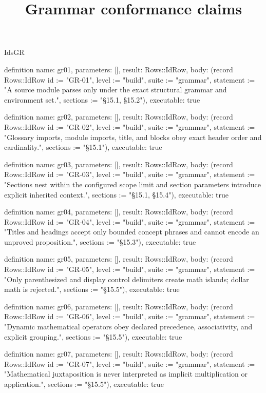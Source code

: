 \begin{lexlean}{IdsGR}
\title{Grammar conformance claims}
\begin{semanticmodule}
definition{
  name: gr01,
  parameters: [],
  result: Rows::IdRow,
  body: (record Rows::IdRow {id := "GR-01", level := "build", suite := "grammar", statement := "A source module parses only under the exact structural grammar and environment set.", sections := "§15.1, §15.2"}),
  executable: true
}

definition{
  name: gr02,
  parameters: [],
  result: Rows::IdRow,
  body: (record Rows::IdRow {id := "GR-02", level := "build", suite := "grammar", statement := "Glossary imports, module imports, title, and blocks obey exact header order and cardinality.", sections := "§15.1"}),
  executable: true
}

definition{
  name: gr03,
  parameters: [],
  result: Rows::IdRow,
  body: (record Rows::IdRow {id := "GR-03", level := "build", suite := "grammar", statement := "Sections nest within the configured scope limit and section parameters introduce explicit inherited context.", sections := "§15.1, §15.4"}),
  executable: true
}

definition{
  name: gr04,
  parameters: [],
  result: Rows::IdRow,
  body: (record Rows::IdRow {id := "GR-04", level := "build", suite := "grammar", statement := "Titles and headings accept only bounded concept phrases and cannot encode an unproved proposition.", sections := "§15.3"}),
  executable: true
}

definition{
  name: gr05,
  parameters: [],
  result: Rows::IdRow,
  body: (record Rows::IdRow {id := "GR-05", level := "build", suite := "grammar", statement := "Only parenthesized and display control delimiters create math islands; dollar math is rejected.", sections := "§15.5"}),
  executable: true
}

definition{
  name: gr06,
  parameters: [],
  result: Rows::IdRow,
  body: (record Rows::IdRow {id := "GR-06", level := "build", suite := "grammar", statement := "Dynamic mathematical operators obey declared precedence, associativity, and explicit grouping.", sections := "§15.5"}),
  executable: true
}

definition{
  name: gr07,
  parameters: [],
  result: Rows::IdRow,
  body: (record Rows::IdRow {id := "GR-07", level := "build", suite := "grammar", statement := "Mathematical juxtaposition is never interpreted as implicit multiplication or application.", sections := "§15.5"}),
  executable: true
}


\end{semanticmodule}
\end{lexlean}
